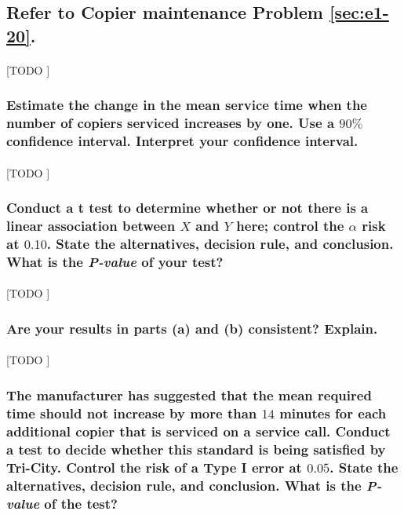 \documentclass{article}
\begin{document}
    \subsection{Refer to \textbf{Copier maintenance} Problem \ref{sec:e1-20}.}

      \paragraph{}
      [TODO ]

      \subsubsection{Estimate the change in the mean service time when the number of copiers serviced increases by one. Use a $90\%$ confidence interval. Interpret your confidence interval.}

        \paragraph{}
        [TODO ]

      \subsubsection{Conduct a t test to determine whether or not there is a linear association between $X$ and $Y$ here; control the $\alpha$ risk at $0.10$. State the alternatives, decision rule, and conclusion. What is the \emph{P-value} of your test?}

        \paragraph{}
        [TODO ]

      \subsubsection{Are your results in parts (a) and (b) consistent? Explain.}

        \paragraph{}
        [TODO ]

      \subsubsection{The manufacturer has suggested that the mean required time should not increase by more
than $14$ minutes for each additional copier that is serviced on a service call. Conduct a test to decide whether this standard is being satisfied by Tri-City. Control the risk of a Type I error at $0.05$. State the alternatives, decision rule, and conclusion. What is the \emph{P-value} of the test?}
\end{document}
